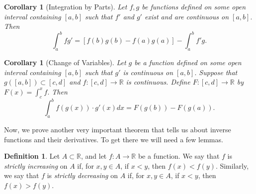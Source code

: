\documentclass[12pt]{article}
\newcommand{\bbR}{\mathbb{R}}
\renewcommand{\_}[1]{\underline{ #1 }}
\newtheorem{corollary}[theorem]{Corollary}
\theoremstyle{definition}
\newtheorem{definition}[theorem]{Definition}
\numberwithin{equation}{subsection}
\begin{document}
\begin{corollary} [Integration by Parts]
Let $f,g$ be functions defined on some open interval containing $[a,b]$ such that 
$f'$ and $g'$ exist and are continuous on $[a,b].$ Then
$$\int_a^b fg' = [f(b)g(b)-f(a)g(a)]-\int_a^b f' g.$$
\end{corollary}   

\begin{corollary}[Change of Variables]
Let $g$ be a function defined on some open interval containing $[a,b]$ such that $g'$ is continuous on $[a,b].$ Suppose that 
$g([a,b])\subset [c,d]$ and $f:[c,d]\longrightarrow\bbR$ is continuous. Define $F:[c,d]\longrightarrow \bbR$ by $F(x)=\int_c^x f.$
Then
$$\int_a^b f(g(x))\cdot g'(x)dx=F(g(b))-F(g(a)).$$
\end{corollary}




\medskip

Now, we prove another very important theorem that tells us about inverse functions and their derivatives. To get there we will need a few lemmas.

\begin{definition}
Let $A\subset\bbR$, and let $f:A\to\bbR$ be a function. We say that $f$ is \emph{strictly increasing} on $A$ if, for $x,y\in A$, if $x< y$, then $f(x)<f(y)$. Similarly, we say that $f$ is \emph{strictly decreasing} on $A$ if, for $x,y\in A$, if $x<y$, then $f(x)>f(y)$. 
\end{definition}
 
\end{document}
